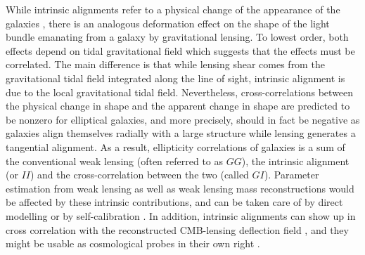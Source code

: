 \documentclass[a4paper,fleqn,usenatbib]{mnras}
\begin{document}
While intrinsic alignments refer to a physical change of the appearance of the galaxies \cite[for reviews, see][]{kiessling_galaxy_2015, joachimi_galaxy_2015, kirk_galaxy_2015, troxel_intrinsic_2015}, there is an analogous deformation effect on the shape of the light bundle emanating from a galaxy by gravitational lensing. To lowest order, both effects depend on tidal gravitational field which suggests that the effects must be correlated. The main difference is that while lensing shear comes from the gravitational tidal field integrated along the line of sight, intrinsic alignment is due to the local gravitational tidal field. Nevertheless, cross-correlations between the physical change in shape and the apparent change in shape are predicted to be nonzero for elliptical galaxies, and more precisely, should in fact be negative as galaxies align themselves radially with a large structure while lensing generates a tangential alignment. As a result, ellipticity correlations of galaxies is a sum of the conventional weak lensing (often referred to as $GG$), the intrinsic alignment (or $II$) and the cross-correlation between the two (called $GI$). Parameter estimation from weak lensing \cite{casarini_non-linear_2011, capranico_intrinsic_2013, Blazek:2017wbz} as well as weak lensing mass reconstructions \cite{fan_intrinsic_2007, chang_dark_2017} would be affected by these intrinsic contributions, and can be taken care of by direct modelling or by self-calibration \cite{troxel_self-calibration_2012, yao_effects_2017, yao_self-calibration_2018, 2020MNRAS.495.3900Y, Pedersen:2019wfp}. In addition, intrinsic alignments can show up in cross correlation with the reconstructed CMB-lensing deflection field \cite{hirata_cross-correlation_2004, hall_intrinsic_2014, chisari_contamination_2015, larsen_intrinsic_2016, merkel_imitating_2017}, and they might be usable as cosmological probes in their own right \cite{pandya_can_2019, 2020ApJ...891L..42T}.
\end{document}
